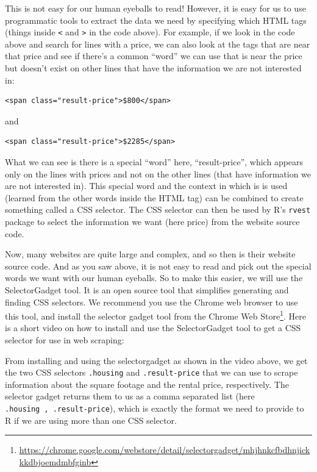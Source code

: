 \documentclass[
]{krantz}
\renewcommand{\href}[2]{#2\footnote{\url{#1}}}
\begin{document}
This is not easy for our human eyeballs to read! However, it is easy for us to use programmatic tools to extract the data we need by specifying which HTML tags (things inside \texttt{\textless{}} and \texttt{\textgreater{}} in the code above). For example, if we look in the code above and search for lines with a price, we can also look at the tags that are near that price and see if there's a common ``word'' we can use that is near the price but doesn't exist on other lines that have the information we are not interested in:

\begin{verbatim}
<span class="result-price">$800</span>
\end{verbatim}

and

\begin{verbatim}
<span class="result-price">$2285</span>
\end{verbatim}

What we can see is there is a special ``word'' here, ``result-price'', which appears only on the lines with prices and not on the other lines (that have information we are not interested in). This special word and the context in which is is used (learned from the other words inside the HTML tag) can be combined to create something called a CSS selector. The CSS selector can then be used by R's \texttt{rvest} package to select the information we want (here price) from the website source code.

Now, many websites are quite large and complex, and so then is their website source code. And as you saw above, it is not easy to read and pick out the special words we want with our human eyeballs. So to make this easier, we will use the SelectorGadget tool. It is an open source tool that simplifies generating and finding CSS selectors. We recommend you use the Chrome web browser to use this tool, and install the \href{https://chrome.google.com/webstore/detail/selectorgadget/mhjhnkcfbdhnjickkkdbjoemdmbfginb}{selector gadget tool from the Chrome Web Store}. Here is a short video on how to install and use the SelectorGadget tool to get a CSS selector for use in web scraping:

From installing and using the selectorgadget as shown in the video above, we get the two CSS selectors \texttt{.housing} and \texttt{.result-price} that we can use to scrape information about the square footage and the rental price, respectively. The selector gadget returns them to us as a comma separated list (here \texttt{.housing\ ,\ .result-price}), which is exactly the format we need to provide to R if we are using more than one CSS selector.
\end{document}
